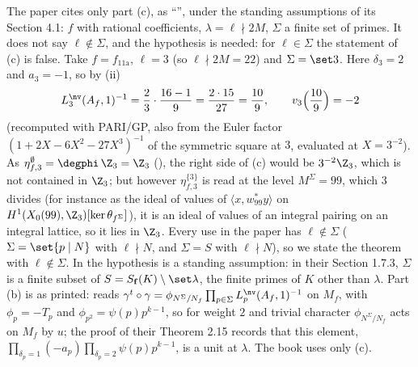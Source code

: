 \begin{remark}\label{rem:congruence:dfg14-status}
The paper cites only part (c), as ``\cite[Proposition 1.4(c)]{DFG04}'', under the standing assumptions of its Section 4.1: $f$ with rational coefficients, $\lambda=\ell\nmid2M$, $\Sigma$ a finite set of
primes. It does not say $\ell\notin\Sigma$, and the hypothesis is needed: for $\ell\in\Sigma$ the statement of (c) is false. Take $f=f_{\text{11a}}$, $\ell=3$ (so $\ell\nmid2M=22$) and
$\Sigma=\set3$. Here $\delta_3=2$ and $a_3=-1$, so by (ii)
\[
L^{\nv}_3(A_f,1)^{-1}=\frac23\cdot\frac{16-1}{9}=\frac{2\cdot15}{27}=\frac{10}9,\qquad v_3\Bigl(\frac{10}9\Bigr)=-2
\]
(recomputed with PARI/GP, also from the Euler factor $(1+2X-6X^2-27X^3)^{-1}$ of the symmetric square at $3$, evaluated at $X=3^{-2}$). As $\eta^\emptyset_{f,3}=\degphi\,\Z_3=\Z_3$
(), the right side of (c) would be $3^{-2}\Z_3$, which is not contained in $\Z_3$; but however $\eta^{\{3\}}_{f,3}$ is read at the level $M^\Sigma=99$, which $3$ divides (for instance as the
ideal of values of $\langle x,w_{99}^*y\rangle$ on $H^1(X_0(99),\Z_3)[\ker\theta_{f^\Sigma}]$), it is an ideal of values of an integral pairing on an integral lattice, so it lies in $\Z_3$. Every use in the paper has $\ell\notin\Sigma$ ($\Sigma=\set{p\mid N}$ with $\ell\nmid N$, and $\Sigma=S$ with $\ell\nmid N$), so we state the theorem with $\ell\notin\Sigma$. In \cite{DFG04} the hypothesis is a standing assumption: in their Section 1.7.3, $\Sigma$ is a finite
subset of $S=S_{\mathbf f}(K)\setminus\set\lambda$, the finite primes of $K$ other than $\lambda$. Part (b) is as printed: \cite[Proposition 1.4(b)]{DFG04} reads
$\gamma^t\circ\gamma=\phi_{N^\Sigma/N_f}\prod_{p\in\Sigma}L^{\nv}_p(A_f,1)^{-1}$ on $M_f$, with $\phi_p=-T_p$ and $\phi_{p^2}=\psi(p)p^{k-1}$, so for weight $2$ and trivial character $\phi_{N^\Sigma/N_f}$ acts on $M_f$ by $u$;
the proof of their Theorem 2.15 records that this element, $\prod_{\delta_p=1}(-a_p)\prod_{\delta_p=2}\psi(p)p^{k-1}$, is a unit at $\lambda$. The book uses only (c).
\end{remark}

